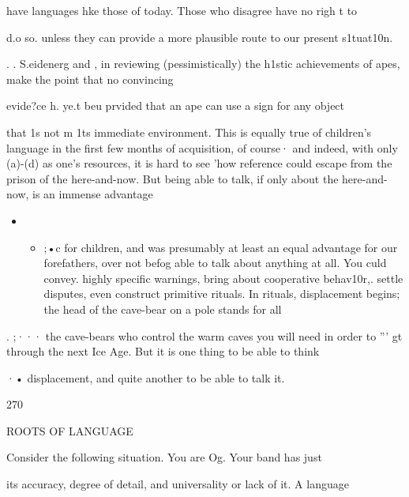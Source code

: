 have languages hke those of today. Those who disagree have no righ t to

d.o so. unless they can provide a more plausible route to our present s1tuat10n.

. . S.eidenerg and \citet{Petitto1979}, in reviewing (pessimistically) the h1stic achievements of apes, make the point that no convincing

evide?ce h{\textquotedbl}{\textquotedbl}. ye.t beu prvided that an ape can use a sign for any object

that 1s not m 1ts immediate environment. This is equally true of chil\-dren's language in the first few months of acquisition, of course· and indeed, with only (a)-(d) as one's resources, it is hard to see 'how reference could escape from the prison of the here-and-now. But being able to talk, if only about the here-and-now, is an immense advantage

\begin{itemize}
\item \begin{itemize}
\item ;•c for children, and was presumably at least an equal advantage for our forefathers, over not befog able to talk about anything at all. You culd convey. highly specific warnings, bring about cooperative beha\-v10r,. settle disputes, even construct primitive rituals. In rituals, dis\-placement begins; the head of the cave-bear on a pole stands for all
\end{itemize}
\end{itemize}

. ;··· the cave-bears who control the warm caves you will need in order to ''' gt through the next Ice Age. But it is one thing to be able to think

·• displacement, and quite another to be able to talk it.

270

ROOTS OF LANGUAGE

Consider the following situation. You are Og. Your band has just


its accuracy, degree of detail, and universality or lack of it. A language

